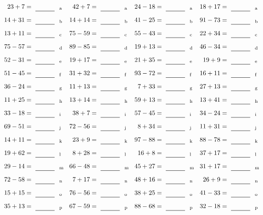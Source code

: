 \documentclass
[
  draft    = true,
  fontsize = 11pt,
  parskip  = half-
]
{scrartcl}
\begin{document}
\clearpage
\begin{align*}
    \pline{23+7}&=\rline{a}
  & \pline{42+7}&=\rline{a}
  & \pline{24-18}&=\rline{a}
  & \pline{18+17}&=\rline{a} \\[1ex]
    \pline{14+31}&=\rline{b}
  & \pline{14+14}&=\rline{b}
  & \pline{41-25}&=\rline{b}
  & \pline{91-73}&=\rline{b} \\[1ex]
    \pline{13+11}&=\rline{c}
  & \pline{75-59}&=\rline{c}
  & \pline{55-43}&=\rline{c}
  & \pline{22+34}&=\rline{c} \\[1ex]
    \pline{75-57}&=\rline{d}
  & \pline{89-85}&=\rline{d}
  & \pline{19+13}&=\rline{d}
  & \pline{46-34}&=\rline{d} \\[1ex]
    \pline{52-31}&=\rline{e}
  & \pline{19+17}&=\rline{e}
  & \pline{21+35}&=\rline{e}
  & \pline{19+9}&=\rline{e} \\[1ex]
    \pline{51-45}&=\rline{f}
  & \pline{31+32}&=\rline{f}
  & \pline{93-72}&=\rline{f}
  & \pline{16+11}&=\rline{f} \\[1ex]
    \pline{36-24}&=\rline{g}
  & \pline{11+13}&=\rline{g}
  & \pline{7+33}&=\rline{g}
  & \pline{27+13}&=\rline{g} \\[1ex]
    \pline{11+25}&=\rline{h}
  & \pline{13+14}&=\rline{h}
  & \pline{59+13}&=\rline{h}
  & \pline{13+41}&=\rline{h} \\[1ex]
    \pline{33-18}&=\rline{i}
  & \pline{38+7}&=\rline{i}
  & \pline{57-45}&=\rline{i}
  & \pline{34-24}&=\rline{i} \\[1ex]
    \pline{69-51}&=\rline{j}
  & \pline{72-56}&=\rline{j}
  & \pline{8+34}&=\rline{j}
  & \pline{11+31}&=\rline{j} \\[1ex]
    \pline{14+11}&=\rline{k}
  & \pline{23+9}&=\rline{k}
  & \pline{97-88}&=\rline{k}
  & \pline{88-78}&=\rline{k} \\[1ex]
    \pline{19+62}&=\rline{l}
  & \pline{8+28}&=\rline{l}
  & \pline{16+8}&=\rline{l}
  & \pline{37+17}&=\rline{l} \\[1ex]
    \pline{29-14}&=\rline{m}
  & \pline{66-48}&=\rline{m}
  & \pline{45+27}&=\rline{m}
  & \pline{31+17}&=\rline{m} \\[1ex]
    \pline{72-58}&=\rline{n}
  & \pline{7+17}&=\rline{n}
  & \pline{48+16}&=\rline{n}
  & \pline{26+9}&=\rline{n} \\[1ex]
    \pline{15+15}&=\rline{o}
  & \pline{76-56}&=\rline{o}
  & \pline{38+25}&=\rline{o}
  & \pline{41-33}&=\rline{o} \\[1ex]
    \pline{35+13}&=\rline{p}
  & \pline{67-59}&=\rline{p}
  & \pline{88-68}&=\rline{p}
  & \pline{32-18}&=\rline{p}
\end{align*}
\end{document}
